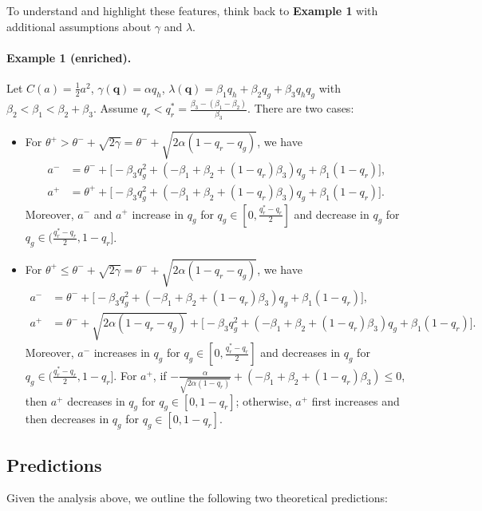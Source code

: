 \documentclass[english,12pt]{article}
\theoremstyle{plain}
\theoremstyle{plain}
\theoremstyle{definition}
\theoremstyle{definition}
\theoremstyle{assumption}
\theoremstyle{plain}
\theoremstyle{plain}
\theoremstyle{plain}
\theoremstyle{plain}
\theoremstyle{definition}%
\theoremstyle{plain}
\theoremstyle{plain}
\theoremstyle{plain}
\theoremstyle{plain}
\theoremstyle{plain}
\begin{document}
To understand and highlight these features, think back to \textbf{Example 1} with additional assumptions about $\gamma$ and $\lambda$.

\paragraph{Example 1 (enriched).} Let $C(a) = \frac{1}{2}a^2$, $\gamma(\bm{q}) = \alpha q_h$, $\lambda(\bm{q}) = \beta_1q_h+\beta_2q_g+\beta_3q_hq_g$ with $\beta_2<\beta_1<\beta_2+\beta_3$. Assume $q_r<q_r^* = \frac{\beta_3-(\beta_1-\beta_2)}{\beta_3}$. There are two cases:
\begin{itemize}
    \item[(1)] For $\theta^+>\theta^-+\sqrt{2\gamma} = \theta^-+\sqrt{2\alpha(1-q_r-q_g)}$, we have
    \begin{align*}
        a^-&= \theta^-+\big[-\beta_3q_g^2 + (-\beta_1+\beta_2+(1-q_r)\beta_3)q_g+\beta_1(1-q_r)\big],\\
        a^+ &= \theta^++\big[-\beta_3q_g^2 + (-\beta_1+\beta_2+(1-q_r)\beta_3)q_g+\beta_1(1-q_r)\big].
    \end{align*}
    Moreover, $a^-$ and $a^+$ increase in $q_g$ for $q_g\in[0,\frac{q_r^*-q_r}{2}]$ and decrease in $q_g$ for $q_g\in(\frac{q_r^*-q_r}{2},1-q_r]$.
    \item[(2)] For $\theta^+\leq \theta^-+\sqrt{2\gamma} = \theta^-+\sqrt{2\alpha(1-q_r-q_g)}$, we have
    \begin{align*}
        a^-&= \theta^-+\big[-\beta_3q_g^2 + (-\beta_1+\beta_2+(1-q_r)\beta_3)q_g+\beta_1(1-q_r)\big],\\
        a^+ &= \theta^-+\sqrt{2\alpha(1-q_r-q_g)}+\big[-\beta_3q_g^2 + (-\beta_1+\beta_2+(1-q_r)\beta_3)q_g+\beta_1(1-q_r)\big].
    \end{align*}
    Moreover, $a^-$ increases in $q_g$ for $q_g\in[0,\frac{q_r^*-q_r}{2}]$ and decreases in $q_g$ for $q_g\in(\frac{q_r^*-q_r}{2},1-q_r]$. For $a^+$, if $-\frac{\alpha}{\sqrt{2\alpha(1-q_r)}} + (-\beta_1+\beta_2+(1-q_r)\beta_3)\leq 0$, then $a^+$ decreases in $q_g$ for $q_g\in [0,1-q_r]$; otherwise, $a^+$ first increases and then decreases in $q_g$ for $q_g\in[0,1-q_r]$.
\end{itemize}


\subsection{Predictions}

Given the analysis above, we outline the following two theoretical predictions:
\end{document}
